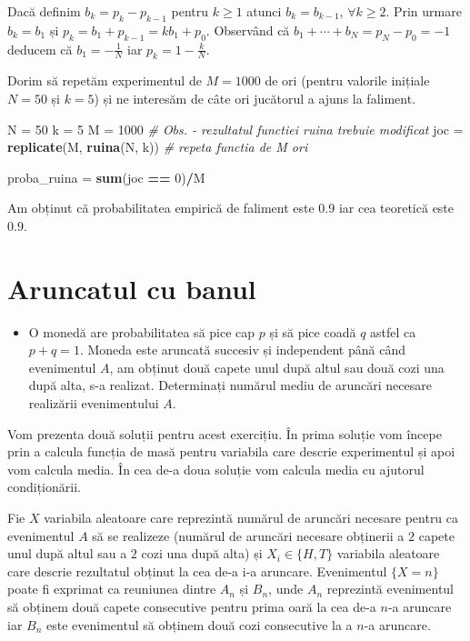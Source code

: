 \documentclass[]{article}
\newenvironment{Shaded}{\begin{snugshade}}{\end{snugshade}}
\newcommand{\KeywordTok}[1]{\textcolor[rgb]{0.13,0.29,0.53}{\textbf{#1}}}
\newcommand{\DecValTok}[1]{\textcolor[rgb]{0.00,0.00,0.81}{#1}}
\newcommand{\StringTok}[1]{\textcolor[rgb]{0.31,0.60,0.02}{#1}}
\newcommand{\CommentTok}[1]{\textcolor[rgb]{0.56,0.35,0.01}{\textit{#1}}}
\newcommand{\OperatorTok}[1]{\textcolor[rgb]{0.81,0.36,0.00}{\textbf{#1}}}
\newcommand{\NormalTok}[1]{#1}
\newenvironment{frshaded*}{%
  \def\FrameCommand{\fboxrule=\FrameRule\fboxsep=\FrameSep \fcolorbox{framecolor}{shadecolor1}}%
  \MakeFramed {\advance\hsize-\width \FrameRestore}}%
{\endMakeFramed}
\newenvironment{rmdblock}[1]
  {\begin{frshaded*}
  \begin{itemize}
  \renewcommand{\labelitemi}{
    \raisebox{-.7\height}[0pt][0pt]{
      {\setkeys{Gin}{width=2em,keepaspectratio}\texttt{[image: images/icons/\#1]}}
    }
  }
  \item
  }
  {
  \end{itemize}
  \end{frshaded*}
  }
\newenvironment{rmdexercise}
  {\begin{rmdblock}{exercise}}
  {\end{rmdblock}}
\begin{document}
Dacă definim \(b_k = p_k - p_{k-1}\) pentru \(k\geq 1\) atunci
\(b_k = b_{k-1}\), \(\forall k\geq2\). Prin urmare \(b_k = b_1\) și
\(p_k = b_1+p_{k-1} = kb_1+p_0\). Observând că
\(b_1+\cdots+b_N=p_N-p_0=-1\) deducem că \(b_1=-\frac{1}{N}\) iar
\(p_k=1-\frac{k}{N}\).

Dorim să repetăm experimentul de \(M = 1000\) de ori (pentru valorile
inițiale \(N = 50\) și \(k = 5\)) și ne interesăm de câte ori jucătorul
a ajuns la faliment.

\begin{Shaded}
\begin{Highlighting}[]
\NormalTok{N =}\StringTok{ }\DecValTok{50}
\NormalTok{k =}\StringTok{ }\DecValTok{5}
\NormalTok{M =}\StringTok{ }\DecValTok{1000}
\CommentTok{# Obs. - rezultatul functiei ruina trebuie modificat}
\NormalTok{joc =}\StringTok{ }\KeywordTok{replicate}\NormalTok{(M, }\KeywordTok{ruina}\NormalTok{(N, k)) }\CommentTok{# repeta functia de M ori }

\NormalTok{proba_ruina =}\StringTok{ }\KeywordTok{sum}\NormalTok{(joc }\OperatorTok{==}\StringTok{ }\DecValTok{0}\NormalTok{)}\OperatorTok{/}\NormalTok{M }
\end{Highlighting}
\end{Shaded}

Am obținut că probabilitatea empirică de faliment este 0.9 iar cea
teoretică este 0.9.

\section{Aruncatul cu banul}\label{aruncatul-cu-banul}

\begin{rmdexercise}
O monedă are probabilitatea să pice cap \(p\) și să pice coadă \(q\)
astfel ca \(p+q=1\). Moneda este aruncată succesiv și independent până
când evenimentul \(A\), am obținut două capete unul după altul sau două
cozi una după alta, s-a realizat. Determinați numărul mediu de aruncări
necesare realizării evenimentului \(A\).
\end{rmdexercise}

Vom prezenta două soluții pentru acest exercițiu. În prima soluție vom
începe prin a calcula funcția de masă pentru variabila care descrie
experimentul și apoi vom calcula media. În cea de-a doua soluție vom
calcula media cu ajutorul condiționării.

Fie \(X\) variabila aleatoare care reprezintă numărul de aruncări
necesare pentru ca evenimentul \(A\) să se realizeze (numărul de
aruncări necesare obținerii a \(2\) capete unul după altul sau a \(2\)
cozi una după alta) și \(X_i\in\{H,T\}\) variabila aleatoare care
descrie rezultatul obținut la cea de-a i-a aruncare. Evenimentul
\(\{X=n\}\) poate fi exprimat ca reuniunea dintre \(A_n\) și \(B_n\),
unde \(A_n\) reprezintă evenimentul să obținem două capete consecutive
pentru prima oară la cea de-a \(n\)-a aruncare iar \(B_n\) este
evenimentul să obținem două cozi consecutive la a \(n\)-a aruncare.
\end{document}
